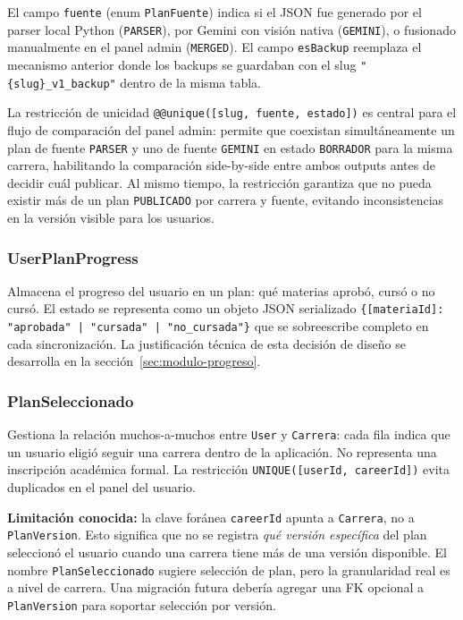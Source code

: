 \documentclass[12pt, a4paper]{report}
\begin{document}
El campo \texttt{fuente} (enum \texttt{PlanFuente}) indica si el JSON fue generado por el
parser local Python (\texttt{PARSER}), por Gemini con visión nativa (\texttt{GEMINI}), o
fusionado manualmente en el panel admin (\texttt{MERGED}). El campo \texttt{esBackup}
reemplaza el mecanismo anterior donde los backups se guardaban con el slug
\texttt{"\{slug\}\_v1\_backup"} dentro de la misma tabla.

La restricción de unicidad \texttt{@@unique([slug, fuente, estado])} es central para el
flujo de comparación del panel admin: permite que coexistan simultáneamente un plan de
fuente \texttt{PARSER} y uno de fuente \texttt{GEMINI} en estado \texttt{BORRADOR} para
la misma carrera, habilitando la comparación side-by-side entre ambos outputs antes de
decidir cuál publicar. Al mismo tiempo, la restricción garantiza que no pueda existir más
de un plan \texttt{PUBLICADO} por carrera y fuente, evitando inconsistencias en la versión
visible para los usuarios.

\subsubsection*{UserPlanProgress}

Almacena el progreso del usuario en un plan: qué materias aprobó, cursó o no cursó. El
estado se representa como un objeto JSON serializado
\texttt{\{[materiaId]: "aprobada"\,|\,"cursada"\,|\,"no\_cursada"\}} que se sobreescribe
completo en cada sincronización. La justificación técnica de esta decisión de diseño se
desarrolla en la sección~\ref{sec:modulo-progreso}.

\subsubsection*{PlanSeleccionado}

Gestiona la relación muchos-a-muchos entre \texttt{User} y \texttt{Carrera}: cada fila
indica que un usuario eligió seguir una carrera dentro de la aplicación. No representa
una inscripción académica formal. La restricción \texttt{UNIQUE([userId, careerId])}
evita duplicados en el panel del usuario.

\textbf{Limitación conocida:} la clave foránea \texttt{careerId} apunta a \texttt{Carrera},
no a \texttt{PlanVersion}. Esto significa que no se registra \emph{qué versión específica}
del plan seleccionó el usuario cuando una carrera tiene más de una versión disponible.
El nombre \texttt{PlanSeleccionado} sugiere selección de plan, pero la granularidad real
es a nivel de carrera. Una migración futura debería agregar una FK opcional a
\texttt{PlanVersion} para soportar selección por versión.
\end{document}
